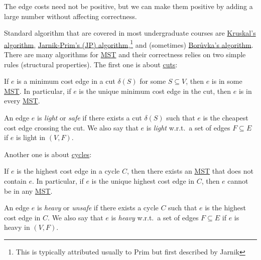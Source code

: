 \begin{remark}
	The edge costs need not be positive, but we can make them positive by adding a large number without affecting correctness.
\end{remark}

Standard algorithm that are covered in most undergraduate courses are \href{https://en.wikipedia.org/wiki/Kruskal%27s_algorithm}{Kruskal's algorithm}, \href{https://en.wikipedia.org/wiki/Prim%27s_algorithm}{Jarnik-Prim's (JP) algorithm},\footnote{This is typically attributed usually to Prim but first described by Jarnik} and (sometimes) \href{https://en.wikipedia.org/wiki/Bor%C5%AFvka%27s_algorithm}{Borůvka's algorithm}. There are many algorithms for \hyperref[prb:MST]{MST} and their correctness relies on two simple rules (structural properties). The first one is about \hyperref[lma:cut-rule]{cuts}:

\begin{lemma}\label{lma:cut-rule}
	If \(e\) is a minimum cost edge in a cut \(\delta (S)\) for some \(S \subseteq V\), then \(e\) is in some \hyperref[prb:MST]{MST}. In particular, if \(e\) is the unique minimum cost edge in the cut, then \(e\) is in every \hyperref[prb:MST]{MST}.
\end{lemma}

\begin{definition}[Light]\label{def:light}
	An edge \(e\) is \emph{light} or \emph{safe} if there exists a cut \(\delta (S)\) such that \(e\) is the cheapest cost edge crossing the cut. We also say that \(e\) is \emph{light} w.r.t.\ a set of edges \(F \subseteq E\) if \(e\) is light in \((V, F)\).
\end{definition}

Another one is about \hyperref[lma:cycle-rule]{cycles}:

\begin{lemma}\label{lma:cycle-rule}
	If \(e\) is the highest cost edge in a cycle \(C\), then there exists an \hyperref[prb:MST]{MST} that does not contain \(e\). In particular, if \(e\) is the unique highest cost edge in \(C\), then \(e\) cannot be in any \hyperref[prb:MST]{MST}.
\end{lemma}

\begin{definition}[Heavy]\label{def:heavy}
	An edge \(e\) is \emph{heavy} or \emph{unsafe} if there exists a cycle \(C\) such that \(e\) is the highest cost edge in \(C\). We also say that \(e\) is \emph{heavy} w.r.t.\ a set of edges \(F \subseteq E\) if \(e\) is heavy in \((V, F)\).
\end{definition}

